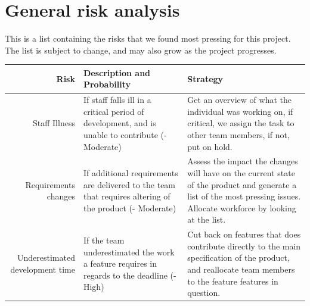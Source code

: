 \documentclass[12pt]{article}%
\begin{document}
\section{General risk analysis}
This is a list containing the risks that we found most pressing for this project. The list is subject to change, and may also grow as the project progresses.


\begin{tabularx}{\linewidth}{ r X X }
\hline
Risk & Description and Probability & Strategy \\ \hline

Staff Illness 
& If staff falls ill in a critical period of development, and is unable to contribute (- Moderate)
& Get an overview of what the individual was working on, if critical, we assign the task to other team members, if not, put on hold.\\

Requirements changes        
&If additional requirements are delivered to the team that requires altering of the product (- Moderate)
& Assess the impact the changes will have on the current state of the product and generate a list of the most pressing issues. Allocate workforce by looking at the list.\\ \hline
Underestimated development time
&If the team underestimated the work a feature requires in regards to the deadline (- High)                         
& Cut back on features that does contribute directly to the main specification of the product, and reallocate team members to the feature features in question.                 \\ \hline
\end{tabularx}
\end{document}
